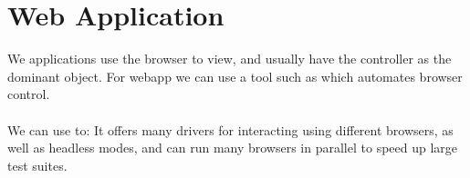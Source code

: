 \documentclass{report}
\begin{document}
    \section*{Web Application}
        We applications use the browser to view, and usually have the controller as the dominant object.
        For webapp we can use a tool such as  which automates browser control. 
        \\
        \\ We can use  to:
        It offers many drivers for interacting using different browsers, as well as headless modes, and can run many browsers in parallel to speed up large test suites.
\end{document}
